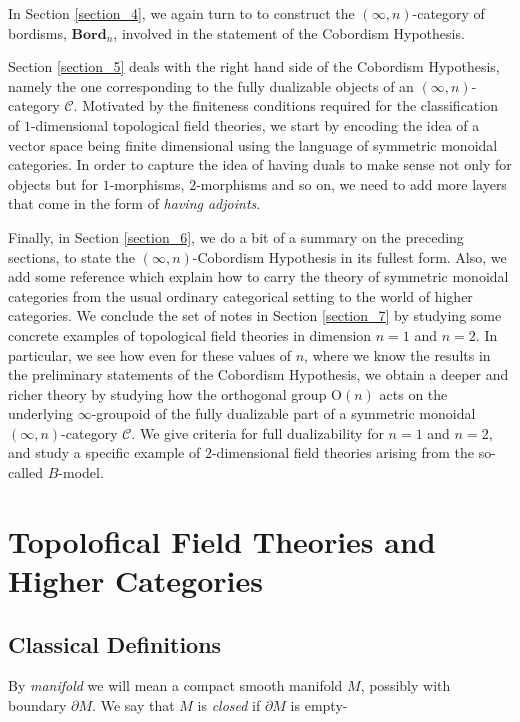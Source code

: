 \documentclass[a4paper,11pt]{article}
\newcommand{\ccal}{\mathcal{C}}
\theoremstyle{plain}
\theoremstyle{definition}
\theoremstyle{remark}
\begin{document}
In Section \ref{section_4}, we again turn to \cite{lurie} to construct the $(\infty, n)$-category of bordisms, $\textbf{Bord}_n$, involved in the statement of the Cobordism Hypothesis. 


Section \ref{section_5} deals with the right hand side of the Cobordism Hypothesis, namely the one corresponding to the fully dualizable objects of an $(\infty, n)$-category $\ccal$. Motivated by the finiteness conditions required for the classification of $1$-dimensional topological field theories, we start by encoding the idea of a vector space being finite dimensional using the language of symmetric monoidal categories. In order to capture the idea of having duals to make sense not only for objects but for $1$-morphisms, $2$-morphisms and so on, we need to add more layers that come in the form of \textit{having adjoints}. 


Finally, in Section \ref{section_6}, we do a bit of a summary on the preceding sections, to state the $(\infty, n)$-Cobordism Hypothesis in its fullest form. Also, we add some reference which explain how to carry the theory of symmetric monoidal categories from the usual ordinary categorical setting to the world of higher categories. We conclude the set of notes in Section \ref{section_7} by studying some concrete examples of topological field theories in dimension $n = 1$ and $n = 2$. In particular, we see how even for these values of $n$, where we know the results in the preliminary statements of the Cobordism Hypothesis, we obtain a deeper and richer theory by studying how the orthogonal group $\text{O}(n)$ acts on the underlying $\infty$-groupoid of the fully dualizable part of a symmetric monoidal $(\infty, n)$-category $\ccal$. We give criteria for full dualizability for $n = 1$ and $n = 2$, and study a specific example of $2$-dimensional field theories arising from the so-called $B$-model. 



\section{Topolofical Field Theories and Higher Categories}
\label{section_1}
\subsection{Classical Definitions}

By \textit{manifold} we will mean a compact smooth manifold $M$, possibly with boundary $\partial M$. We say that $M$ is \textit{closed} if $\partial M$ is empty- 
\end{document}
